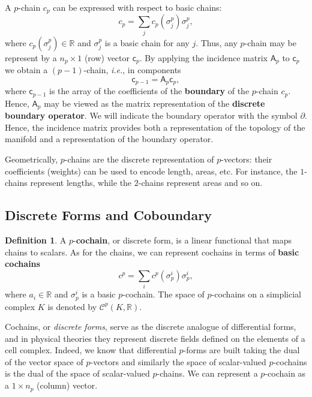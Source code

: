 \documentclass{article}
\theoremstyle{definition} %
\newtheorem{Def}{Definition}
\theoremstyle{plain} %
\theoremstyle{remark} %
\newcommand{\rr}{\mathbb{R}}
\begin{document}
A $p$-chain $c_p$ can be expressed with respect to basic chains:
\begin{equation}
    c_p = \sum_j c_p(\sigma^p_j) \sigma^p_j,
\end{equation}
where $c_p(\sigma^p_j) \in \rr$ and $\sigma^p_j$ is a basic chain for any $j$. Thus, any $p$-chain may be represent by a $n_p \times 1$ (row) vector $\mathsf{c}_p$. By applying the incidence matrix $\mathsf{A}_p$ to $\mathsf{c}_p$ we obtain a $(p-1)$-chain, \textit{i.e.}, in components
\begin{equation}
    \mathsf{c}_{p-1} = \mathsf{A}_p \mathsf{c}_p,
\end{equation}
where $\mathsf{c}_{p-1}$ is the array of the coefficients of the \textbf{boundary} of the $p$-chain $c_p$. Hence, $\mathsf{A}_p$ may be viewed as the matrix representation of the \textbf{discrete boundary operator}. We will indicate the boundary operator with the symbol $\partial$.
Hence, the incidence matrix provides both a representation of the topology of the manifold and a representation of the boundary operator.

Geometrically, $p$-chains are the discrete representation of $p$-vectors: their coefficients (weights) can be used to encode length, areas, etc.
For instance, the $1$-chains represent lengths, while the $2$-chains represent areas and so on.

\subsection{Discrete Forms and Coboundary}

\begin{Def}
        A $p$-\textbf{cochain}, or discrete form, is a linear functional that maps chains to scalars. As for the chains, we can represent cochains in terms of \textbf{basic cochains}
        \begin{equation}
            c^p = \sum_i c^p(\sigma_p^i) \sigma_p^i, \label{eq: cochain_def}
        \end{equation}
        where $a_i \in \rr$ and $\sigma_p^i$ is a basic $p$-cochain. The space of $p$-cochains on a simplicial complex $K$ is denoted by $\mathcal{C}^p(K, \rr)$.
\end{Def}
Cochains, or \textsl{discrete forms}, serve as the discrete analogue of differential forms, and in physical theories they represent discrete fields defined on the elements of a cell complex. Indeed, we know \cite{grady2010discrete} that differential $p$-forms are built taking the dual of the vector space of $p$-vectors and similarly the space of scalar-valued $p$-cochains is the dual of the space of scalar-valued $p$-chains.
We can represent a $p$-cochain as a $1 \times n_p$ (column) vector.
\end{document}
